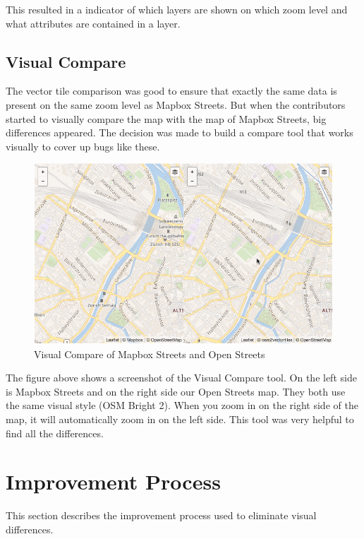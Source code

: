 This resulted in a indicator of which layers are shown on which zoom level and what attributes are contained in a layer.
\newpage

\subsection{Visual Compare}\label{visual_compare}
The vector tile comparison was good to ensure that exactly the same data is present on the same zoom level as Mapbox Streets.
But when the contributors started to visually compare the map with the map of Mapbox Streets, big differences appeared.
The decision was made to build a compare tool that works visually to cover up bugs like these.

\begin{figure}[H]
\centering
  \includegraphics[width=1\textwidth]{images/visual_compare.png}
  \caption{Visual Compare of Mapbox Streets and Open Streets}
\end{figure}

The figure above shows a screenshot of the Visual Compare tool. On the left side is Mapbox Streets and on the right side our Open Streets map. They both use the same visual style (OSM Bright 2\cite{92_github_2015}). When you zoom in on the right side of the map, it will automatically zoom in on the left side. This tool was very helpful to find all the differences.
\newpage

\section{Improvement Process}

This section describes the improvement process used to eliminate visual differences.

